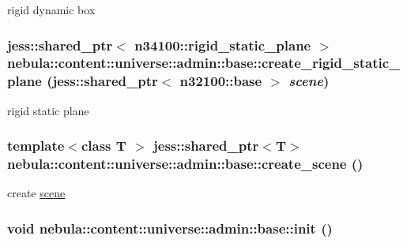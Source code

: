 rigid dynamic box \hypertarget{classnebula_1_1content_1_1universe_1_1admin_1_1base_a8a67671d71633f028172fd1a0191d584}{
\subsubsection[{create\_\-rigid\_\-static\_\-plane}]{\setlength{\rightskip}{0pt plus 5cm}jess::shared\_\-ptr$<$ {\bf n34100::rigid\_\-static\_\-plane} $>$ nebula::content::universe::admin::base::create\_\-rigid\_\-static\_\-plane (jess::shared\_\-ptr$<$ {\bf n32100::base} $>$ {\em scene})}}
\label{classnebula_1_1content_1_1universe_1_1admin_1_1base_a8a67671d71633f028172fd1a0191d584}


rigid static plane \hypertarget{classnebula_1_1content_1_1universe_1_1admin_1_1base_a0ef9b92f44d27ed52db2bbfefc1fa805}{
\subsubsection[{create\_\-scene}]{\setlength{\rightskip}{0pt plus 5cm}template$<$class T $>$ jess::shared\_\-ptr$<$T$>$ nebula::content::universe::admin::base::create\_\-scene ()}}
\label{classnebula_1_1content_1_1universe_1_1admin_1_1base_a0ef9b92f44d27ed52db2bbfefc1fa805}


create \hyperlink{namespacenebula_1_1content_1_1scene}{scene} \hypertarget{classnebula_1_1content_1_1universe_1_1admin_1_1base_a9f4f3553a746519a33bc9357880c200c}{
\subsubsection[{init}]{\setlength{\rightskip}{0pt plus 5cm}void nebula::content::universe::admin::base::init ()}}
\label{classnebula_1_1content_1_1universe_1_1admin_1_1base_a9f4f3553a746519a33bc9357880c200c}


